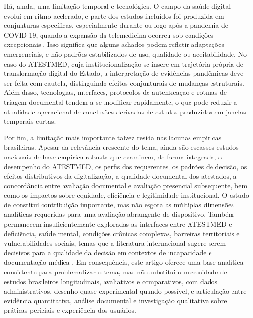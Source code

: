 \documentclass[12pt,a4paper]{article}
\begin{document}
Há, ainda, uma limitação temporal e tecnológica. O campo da saúde digital evolui em ritmo acelerado, e parte dos estudos incluídos foi produzida em conjunturas específicas, especialmente durante ou logo após a pandemia de COVID-19, quando a expansão da telemedicina ocorreu sob condições excepcionais \parencite{ftouni2022challengesoftelemedicineduringthecovid19pandemica}. Isso significa que alguns achados podem refletir adaptações emergenciais, e não padrões estabilizados de uso, qualidade ou aceitabilidade. No caso do ATESTMED, cuja institucionalização se insere em trajetória própria de transformação digital do Estado, a interpretação de evidências pandêmicas deve ser feita com cautela, distinguindo efeitos conjunturais de mudanças estruturais. Além disso, tecnologias, interfaces, protocolos de autenticação e rotinas de triagem documental tendem a se modificar rapidamente, o que pode reduzir a atualidade operacional de conclusões derivadas de estudos produzidos em janelas temporais curtas.

Por fim, a limitação mais importante talvez resida nas lacunas empíricas brasileiras. Apesar da relevância crescente do tema, ainda são escassos estudos nacionais de base empírica robusta que examinem, de forma integrada, o desempenho do ATESTMED, os perfis dos requerentes, os padrões de decisão, os efeitos distributivos da digitalização, a qualidade documental dos atestados, a concordância entre avaliação documental e avaliação presencial subsequente, bem como os impactos sobre equidade, eficiência e legitimidade institucional. O estudo de \textcite{soares20241031t0000000000asistematicadoatestmednaconcessa} constitui contribuição importante, mas não esgota as múltiplas dimensões analíticas requeridas para uma avaliação abrangente do dispositivo. Também permanecem insuficientemente exploradas as interfaces entre ATESTMED e deficiência, saúde mental, condições crônicas complexas, barreiras territoriais e vulnerabilidades sociais, temas que a literatura internacional sugere serem decisivos para a qualidade da decisão em contextos de incapacidade e documentação médica \parencite{hospital2016mentaldisabilityaretrospectivestudyofsocioclinica,feudtner2014pediatriccomplexchronicconditionsclassificationsyst,gao2019disabilityconcentrationandaccesstorehabilitationservice}. Em consequência, este artigo oferece uma base analítica consistente para problematizar o tema, mas não substitui a necessidade de estudos brasileiros longitudinais, avaliativos e comparativos, com dados administrativos, desenho quase experimental quando possível, e articulação entre evidência quantitativa, análise documental e investigação qualitativa sobre práticas periciais e experiência dos usuários.
\end{document}
